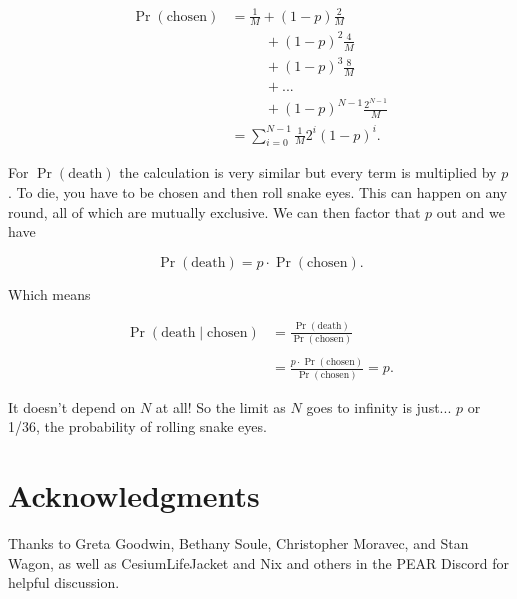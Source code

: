 \documentclass[article,twocolumn]{memoir}
\begin{document}
\begin{equation}
\begin{split}
\Pr(\text{chosen}) & = \tfrac{1}{M} + (1-p)\tfrac{2}{M} \\
& \phantom{mmii} + (1-p)^2\tfrac{4}{M} \\
& \phantom{mmii} + (1-p)^3\tfrac{8}{M} \\
& \phantom{mmii} + ... \\
& \phantom{mmii} + (1-p)^{N-1}\frac{2^{N-1}}{M} \\
& = \sum_{i=0}^{N-1} \tfrac{1}{M} 2^i(1-p)^i.
\end{split}
\end{equation}

For $\Pr(\text{death})$ the calculation is very similar but every term is multiplied by $p$.
To die, you have to be chosen and then roll snake eyes.
This can happen on any round, all of which are mutually exclusive.
We can then factor that $p$ out and we have

$$
\Pr(\text{death}) = p\cdot\Pr(\text{chosen}).
$$

Which means

\begin{equation}
\begin{split}
\Pr(\text{death} \mid \text{chosen}) & = 
\frac{\Pr(\text{death})}{\Pr(\text{chosen})} \\\\
& = \frac{p\cdot\Pr(\text{chosen})}{\Pr(\text{chosen})} = 
p.
\end{split}
\end{equation}

It doesn't depend on $N$ at all!
So the limit as $N$ goes to infinity is just... 
$p$ or 1/36, the probability of rolling snake eyes.
\qedsymbol{}


\chapter*{Acknowledgments}

Thanks to 
Greta Goodwin, 
Bethany Soule, 
Christopher Moravec,
and Stan Wagon, as well as
CesiumLifeJacket and Nix and others in the PEAR Discord for helpful discussion.
\end{document}
